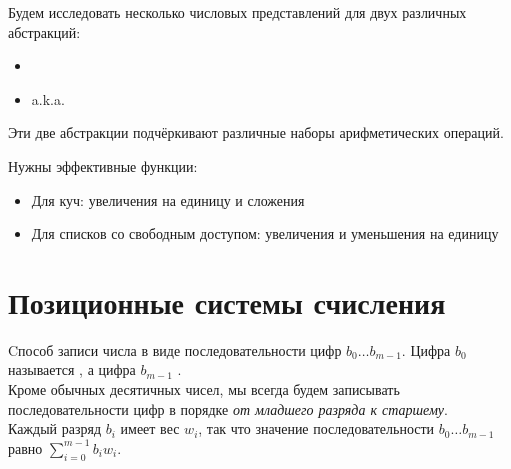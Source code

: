 \begin{frame}[fragile]{}

Будем исследовать несколько числовых представлений для двух
различных абстракций:
\begin{itemize}
  \item   {}
  \item  {} a.k.a. 
\end{itemize}\vspace{.5cm}


Эти две абстракции подчёркивают различные наборы
арифметических операций. 

Нужны  эффективные функции:
\begin{itemize}
  \item Для куч: увеличения на единицу и сложения
  \item Для списков со свободным доступом: увеличения и уменьшения на единицу
\end{itemize}


\end{frame}


\section{Позиционные системы счисления}
\label{sc:9.1}

\begin{frame}[fragile]{}


Cпособ записи числа в виде последовательности
цифр $b_0\ldots b_{m-1}$. Цифра $b_0$ называется , а цифра $b_{m-1}$ . \\

Кроме обычных десятичных чисел, мы всегда будем
записывать последовательности цифр в порядке \emph{от младшего разряда к старшему}.\\

Каждый разряд $b_i$ имеет вес $w_i$, так что значение
последовательности $b_0\ldots b_{m-1}$ равно $\sum_{i=0}^{m-1}
b_iw_i$.
\end{frame}

